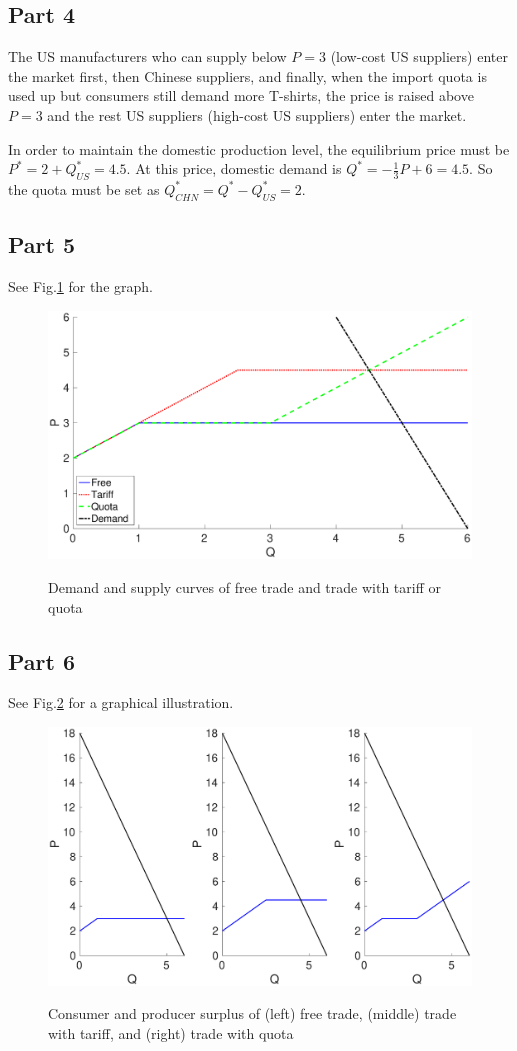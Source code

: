 \documentclass{article}
\begin{document}
\subsection{Part 4}
The US manufacturers who can supply below $P=3$ (low-cost US suppliers) enter the market first, then Chinese suppliers, and finally, when the import quota is used up but consumers still demand more T-shirts, the price is raised above $P=3$ and the rest US suppliers (high-cost US suppliers) enter the market.

In order to maintain the domestic production level, the equilibrium price must be $P^*=2+Q^*_{US}=4.5$. At this price, domestic demand is $Q^*=-\frac{1}{3}P+6=4.5$. So the quota must be set as $Q^*_{CHN}=Q^*-Q^*_{US}=2$.

\subsection{Part 5}
See Fig.\ref{DandS} for the graph.
\begin{figure}[!htbp]
	\centering
	\includegraphics[width=12cm]{figure1.eps}\\
	\caption{Demand and supply curves of free trade and trade with tariff or quota}
	\label{DandS}
\end{figure}

\subsection{Part 6}
See Fig.\ref{surplus} for a graphical illustration.
\begin{figure}[!htbp]
	\centering
	\includegraphics[width=12cm]{figure2.eps}\\
	\caption{Consumer and producer surplus of (left) free trade, (middle) trade with tariff, and (right) trade with quota}
	\label{surplus}
\end{figure}
\end{document}
